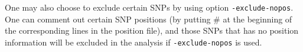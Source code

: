 \documentclass[11pt,Palatino]{article}
\begin{document}
One may also choose to exclude certain SNPs by using option {\tt -exclude-nopos}. One can comment out certain SNP positions (by putting \# at the beginning of the corresponding lines in the position file), and those SNPs that has no position information will be excluded in the analysis if {\tt -exclude-nopos} is used.  


%

%
%
\end{document}
